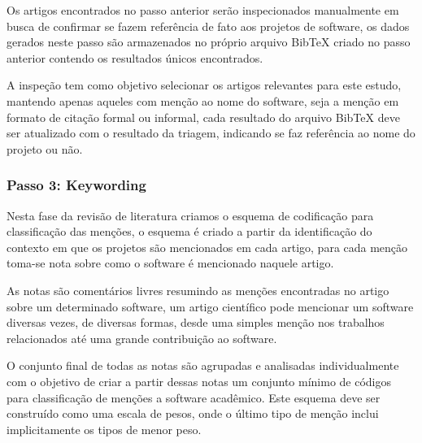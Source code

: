 
Os artigos encontrados no passo anterior serão inspecionados manualmente em
busca de confirmar se fazem referência de fato aos projetos de software,
os dados gerados neste passo são armazenados no próprio arquivo BibTeX criado
no passo anterior contendo os resultados únicos encontrados.

A inspeção tem como objetivo selecionar os artigos relevantes para este estudo,
mantendo apenas aqueles com menção ao nome do software, seja a menção em
formato de citação formal ou informal, cada resultado do arquivo BibTeX deve
ser atualizado com o resultado da triagem, indicando se faz referência ao
nome do projeto ou não.



\subsubsection{Passo 3: Keywording}


Nesta fase da revisão de literatura criamos o esquema de codificação para
classificação das menções, o esquema é criado a partir da identificação do
contexto em que os projetos são mencionados em cada artigo, para cada menção
toma-se nota sobre como o software é mencionado naquele artigo.

As notas são comentários livres resumindo as menções encontradas no artigo
sobre um determinado software, um artigo científico pode mencionar um software
diversas vezes, de diversas formas, desde uma simples menção nos trabalhos
relacionados até uma grande contribuição ao software.

O conjunto final de todas as notas são agrupadas e analisadas individualmente
com o objetivo de criar a partir dessas notas um conjunto mínimo de códigos
para classificação de menções a software acadêmico. Este esquema deve ser construído
como uma escala de pesos, onde o último tipo de menção inclui implicitamente os
tipos de menor peso.

